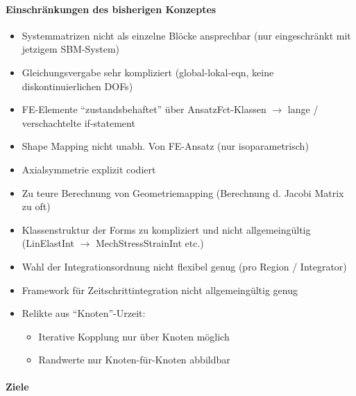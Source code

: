 \paragraph{Einschränkungen des bisherigen Konzeptes}
\begin{itemize}
\item Systemmatrizen nicht als  einzelne Blöcke ansprechbar (nur eingeschränkt
  mit jetzigem SBM-System)

\item    Gleichungsvergabe   sehr    kompliziert   (global-lokal-eqn,    keine
  diskontinuierlichen DOFs)

\item  FE-Elemente ``zustandsbehaftet''  über AnsatzFct-Klassen  $\rightarrow$
  lange / verschachtelte if-statement

\item Shape Mapping nicht unabh. Von FE-Ansatz (nur isoparametrisch)

\item Axialsymmetrie explizit codiert

\item Zu teure Berechnung von Geometriemapping (Berechnung d. Jacobi Matrix zu
  oft)

\item  Klassenstruktur  der Forms  zu  kompliziert  und nicht  allgemeingültig
  (LinElastInt $\rightarrow$ MechStressStrainInt etc.)

\item  Wahl  der  Integrationsordnung  nicht  flexibel  genug  (pro  Region  /
  Integrator)

\item Framework für Zeitschrittintegration nicht allgemeingültig genug

\item Relikte aus ``Knoten''-Urzeit:

\begin{itemize}
\item Iterative Kopplung nur über Knoten möglich
\item Randwerte nur Knoten-für-Knoten abbildbar
\end{itemize}

\end{itemize}

\paragraph{Ziele}

